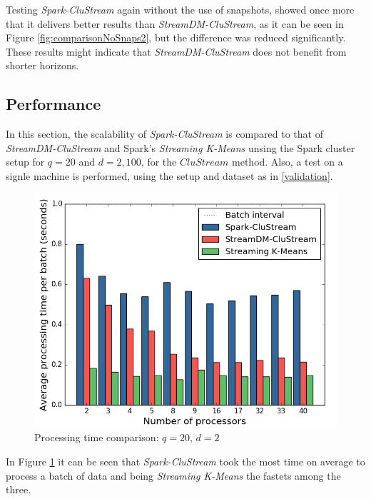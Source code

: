 Testing \textit{Spark-CluStream} again without the use of snapshots, showed once more that it delivers better results than \textit{StreamDM-CluStream}, as it can be seen in Figure \ref{fig:comparisonNoSnaps2}, but the difference was reduced significantly. These results might indicate that \textit{StreamDM-CluStream} does not benefit from shorter horizons.

\subsection{Performance}

In this section, the scalability of \textit{Spark-CluStream} is compared to that of \textit{StreamDM-CluStream} and Spark's \textit{Streaming K-Means} unsing the Spark cluster setup for $q=20$ and $d=2,100$, for the $CluStream$ method. Also, a test on a signle machine is performed, using the setup and dataset as in \ref{validation}.


\begin{figure}[h!]
 \centering
 \includegraphics[scale=0.47]{./styles/perfComp2.png}
 \caption{Processing time comparison: $q=20$, $d=2$}
 \label{fig:perfComp2}
\end{figure}

In Figure \ref{fig:perfComp2} it can be seen that \textit{Spark-CluStream} took the most time on average to process a batch of data and being \textit{Streaming K-Means} the fastets among the three. 


